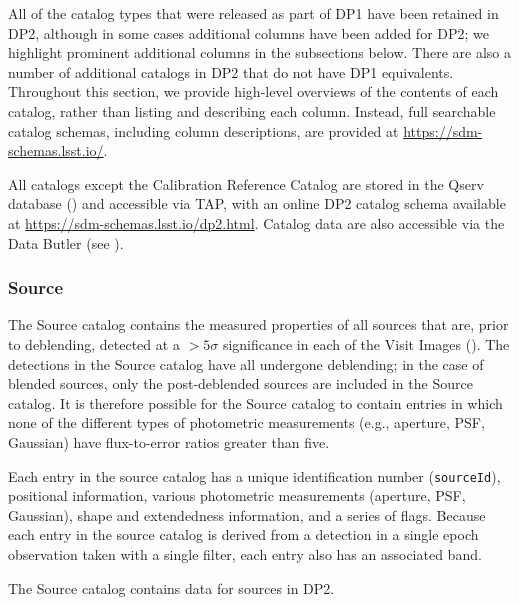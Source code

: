 All of the catalog types that were released as part of DP1 have been retained in DP2, although in some cases additional columns have been added for DP2; we highlight prominent additional columns in the subsections below.
There are also a number of additional catalogs in DP2 that do not have \gls{DP1} equivalents.
Throughout this section, we provide high-level overviews of the contents of each catalog, rather than listing and describing each column.
Instead, full searchable catalog schemas, including column descriptions, are provided at \url{https://sdm-schemas.lsst.io/}.

All catalogs except the Calibration Reference Catalog \citep[][]{DMTN-277} are stored in the Qserv database () and accessible via \gls{TAP}, with an online DP2 catalog schema available at \url{https://sdm-schemas.lsst.io/dp2.html}.
Catalog data are also accessible via the Data \gls{Butler} (see ).


\subsubsection{Source}
\label{sssec:source}
The Source catalog contains the measured properties of all sources that are, prior to deblending, detected at a $>5\sigma$ significance in each of the \glspl{Visit Image} ().
The detections in the \gls{Source} catalog have all undergone deblending; in the case of blended sources, only the post-deblended sources are included in the \gls{Source} catalog.
It is therefore possible for the Source catalog to contain entries in which none of the different types of photometric measurements (e.g., aperture, \gls{PSF}, Gaussian) have flux-to-error ratios greater than five.

Each entry in the source catalog has a unique identification number (\texttt{sourceId}), positional information, various photometric measurements (aperture, PSF, Gaussian), shape and extendedness information, and a series of flags.
Because each entry in the source catalog is derived from a detection in a single epoch observation taken with a single filter, each entry also has an associated band.

The Source catalog contains data for \nsources sources in \gls{DP2}.

